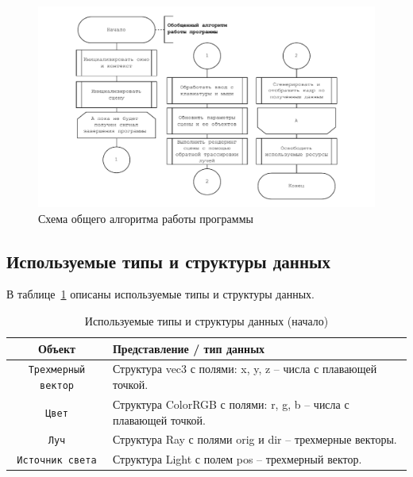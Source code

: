 \newpage
\begin{figure}[ht!]
	\begin{center}
		\includegraphics[scale=0.9]{diag/main-general.pdf}
	\end{center}
	\caption{Схема общего алгоритма работы программы}
	\label{fig:gen}
\end{figure}

\subsection{Используемые типы и структуры данных}

В таблице~\ref{tb:types-1} описаны используемые типы и структуры данных.

\begin{table}[ht!]
	\caption{Используемые типы и структуры данных (начало)}
	\centering{}	
	\begin{tabular}{|c|>{\arraybackslash}p{10.5cm}|} \hline
		\textbf{Объект} & \textbf{Представление / тип данных} \\
		\hline\hline
		
		\texttt{Трехмерный вектор} & Структура vec3 с полями: x, y, z -- числа с плавающей точкой. \\ \hline
		
		\texttt{Цвет} & Структура ColorRGB с полями: r, g, b -- числа с плавающей точкой. \\ \hline
		
		\texttt{Луч} & Структура Ray с полями orig и dir -- трехмерные векторы. \\ \hline
		
		\texttt{Источник света} &  Структура Light с полем pos -- трехмерный вектор. \\ \hline
	\end{tabular}\label{tb:types-1}
\end{table}

